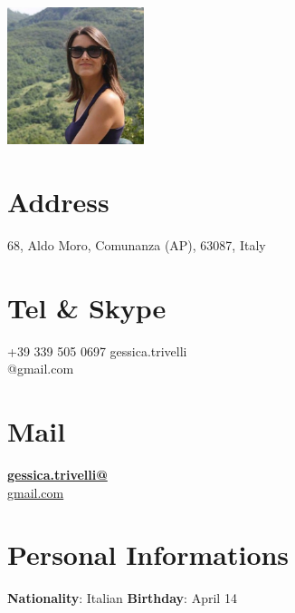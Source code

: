 \documentclass[11pt, print]{friggeri-cv}
\begin{document}
      
\begin{aside}
  \includegraphics[width=4cm, keepaspectratio]{img/gessica_crop.jpg}
  ~
  ~
	\section{Address}
	68, Aldo Moro,
	Comunanza (AP), 63087, Italy
    ~
	\section{Tel \& Skype}
    +39 339 505 0697 \vspace{3pt}
    gessica.trivelli\\@gmail.com
    ~
	\section{Mail}
    \href{mailto:gessica.trivelli@gmail.com}{\textbf{gessica.trivelli@}\\gmail.com}
    ~
    \section{Personal Informations}
	\textbf{Nationality}: Italian
	\textbf{Birthday}: April 14
	~
\end{aside}
\end{document}
